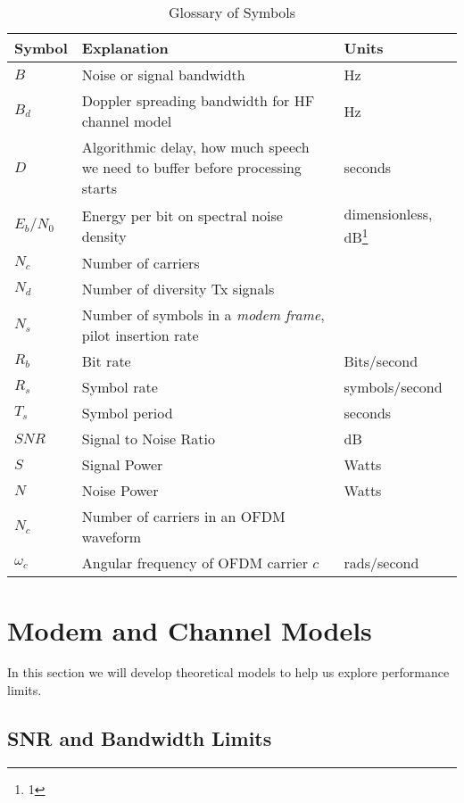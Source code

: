 \documentclass{article}
\begin{document}
\begin{table}[h]
\centering
\begin{tabular}{l m{6cm} l}
 \hline
 Symbol & Explanation & Units \\
 \hline
 $B$ & Noise or signal bandwidth & Hz \\
 $B_d$ & Doppler spreading bandwidth for HF channel model & Hz \\
 $D$ & Algorithmic delay, how much speech we need to buffer before processing starts & seconds \\
 $E_b/N_0$ & Energy per bit on spectral noise density & dimensionless, dB\footnote{1} \\
 $N_c$ & Number of carriers  \\
 $N_d$ & Number of diversity Tx signals  \\
 $N_s$ & Number of symbols in a \emph{modem frame}, pilot insertion rate  \\
 $R_b$ & Bit rate & Bits/second \\
 $R_s$ & Symbol rate & symbols/second \\
 $T_s$ & Symbol period & seconds \\
 $SNR$ & Signal to Noise Ratio & dB \\
 $S$ & Signal Power & Watts \\
 $N$ & Noise Power & Watts \\
 $N_c$ & Number of carriers in an OFDM waveform \\
 $\omega_c$ & Angular frequency of OFDM carrier $c$ & rads/second \\ 
 \hline
\end{tabular}
\caption{Glossary of Symbols}
\end{table}


\clearpage

\section{Modem and Channel Models}

In this section we will develop theoretical models to help us explore performance limits.

\subsection{SNR and Bandwidth Limits}
\end{document}

